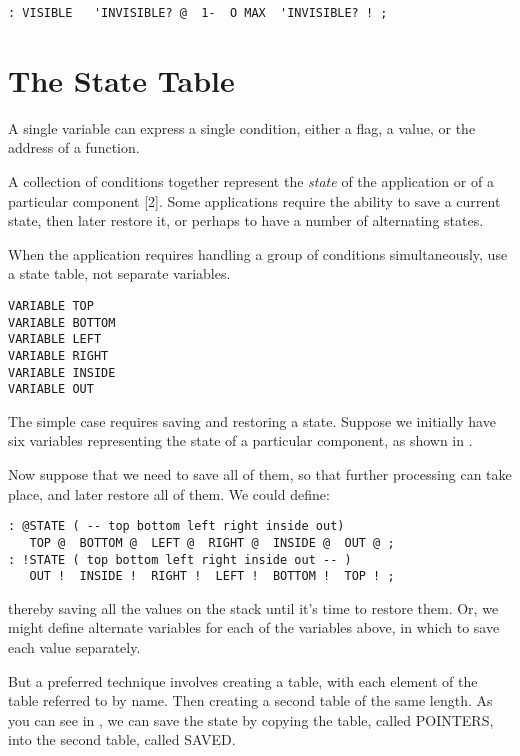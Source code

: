 \begin{verbatim}
: VISIBLE   'INVISIBLE? @  1-  O MAX  'INVISIBLE? ! ;
\end{verbatim}

\section{The State Table}

A single variable can express a single condition, either a flag, a value, or
the address of a function.

A collection of conditions together represent the \emph{state} of the
application or of a particular component [2]. Some applications require the
ability to save a current state, then later restore it, or perhaps to have a
number of alternating states.

\begin{tip}
When the application requires handling a group of conditions
simultaneously, use a state table, not separate variables.
\end{tip}

\begin{verbatim}
VARIABLE TOP
VARIABLE BOTTOM
VARIABLE LEFT
VARIABLE RIGHT
VARIABLE INSIDE
VARIABLE OUT
\end{verbatim}

The simple case requires saving and restoring a state. Suppose we initially
have six variables representing the state of a particular component, as
shown in .

Now suppose that we need to save all of them, so that further processing
can take place, and later restore all of them. We could define:

\begin{verbatim}
: @STATE ( -- top bottom left right inside out)
   TOP @  BOTTOM @  LEFT @  RIGHT @  INSIDE @  OUT @ ;
: !STATE ( top bottom left right inside out -- )
   OUT !  INSIDE !  RIGHT !  LEFT !  BOTTOM !  TOP ! ;
\end{verbatim}

thereby saving all the values on the stack until it's time to restore them.
Or, we might define alternate variables for each of the variables above, in
which to save each value separately.

But a preferred technique involves creating a table, with each
element of the table referred to by name. Then creating a second table of
the same length. As you can see in , we can save the state by
copying the table, called POINTERS, into the second table, called
SAVED.

